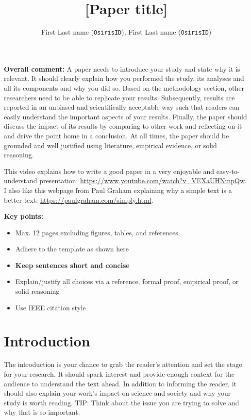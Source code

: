 \documentclass[10pt,a4paper]{article}
\title{[Paper title]}
\author{
    First Last name (\texttt{OsirisID}), 
    First Last name (\texttt{OsirisID})
}
\date{}  %
\begin{document}
\maketitle

\textbf{Overall comment:}
A paper needs to introduce your study and state why it is relevant. It should clearly explain how you performed the study, its analyses and all its components and why you did so. Based on the methodology section, other researchers need to be able to replicate your results. Subsequently, results are reported in an unbiased and scientifically acceptable way such that readers can easily understand the important aspects of your results. Finally, the paper should discuss the impact of its results by comparing to other work and reflecting on it and drive the point home in a conclusion. At all times, the paper should be grounded and well justified using literature, empirical evidence, or solid reasoning.

This video explains how to write a good paper in a very enjoyable and easy-to-understand presentation: \url{https://www.youtube.com/watch?v=VEXaUHNmpQw}. I also like this webpage from Paul Graham explaining why a simple text is a better text: \url{https://paulgraham.com/simply.html}. 

\textbf{Key points:}
\begin{itemize}
    \item Max. 12 pages excluding figures, tables, and references
    \item Adhere to the template as shown here
    \item \textbf{Keep sentences short and concise}
    \item Explain/justify all choices via a reference, formal proof, empirical proof, or solid reasoning
    \item Use IEEE citation style
\end{itemize}

\section{Introduction}\label{sec:introduction}
The introduction is your chance to grab the reader's attention and set the stage for your research. It should spark interest and provide enough context for the audience to understand the text ahead. In addition to informing the reader, it should also explain your work's impact on science and society and why your study is worth reading. TIP: Think about the issue you are trying to solve and why that is so important.
\end{document}

